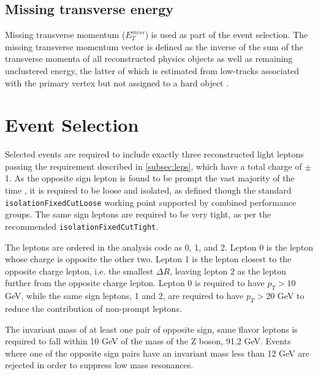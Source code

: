 \documentclass[NOTE, atlasdraft=true, texlive=2016, UKenglish]{\ATLASLATEXPATH atlasdoc}
\begin{document}
\subsection{Missing transverse energy}
\label{subsec:met}

Missing transverse momentum ($E_T^{miss}$) is used as part of the event selection. The missing transverse momentum vector is defined as the inverse of the sum of the transverse momenta of all reconstructed physics objects as well as remaining unclustered energy, the latter of which is estimated from low-\pt tracks associated with the primary vertex but not assigned to a hard object \cite{ATL-PHYS-PUB-2015-027}. 

\section{Event Selection}
\label{sec:evt_selection}

Selected events are required to include exactly three reconstructed light leptons passing the requirement described in \ref{subsec:leps}, which have a total charge of $\pm$1. As the opposite sign lepton is found to be prompt the vast majority of the time \cite{ttH_paper}, it is required to be loose and isolated, as defined though the standard \verb|isolationFixedCutLoose| working point supported by combined performance groups. The same sign leptons are required to be very tight, as per the recommended \verb|isolationFixedCutTight|.

The leptons are ordered in the analysis code as 0, 1, and 2. Lepton 0 is the lepton whose charge is opposite the other two. Lepton 1 is the lepton closest to the opposite charge lepton, i.e. the smallest $\Delta R$, leaving lepton 2 as the lepton further from the opposite charge lepton. Lepton 0 is required to have $p_T > 10$ GeV, while the same sign leptons, 1 and 2, are required to have $p_T > 20$ GeV to reduce the contribution of non-prompt leptons.  

The invariant mass of at least one pair of opposite sign, same flavor leptons is required to fall within 10 GeV of the mass of the Z boson, 91.2 GeV. Events where one of the opposite sign pairs have an invariant mass less than 12 GeV are rejected in order to suppress low mass resonances. %
\end{document}

